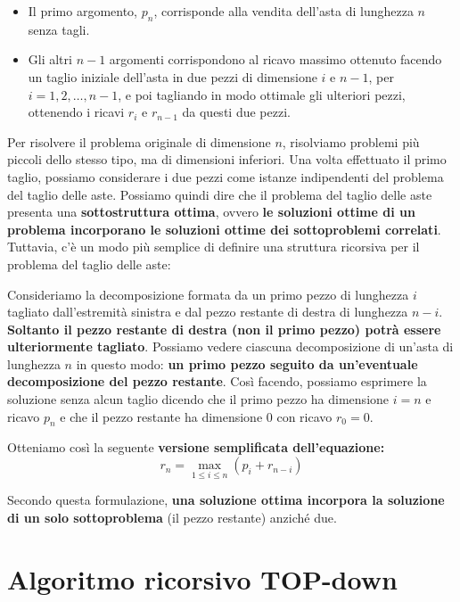 \begin{itemize}
  \item
        Il primo argomento, $p_n$, corrisponde alla vendita dell'asta di
        lunghezza $n$ senza tagli.
  \item
        Gli altri $n-1$ argomenti corrispondono al ricavo massimo ottenuto
        facendo un taglio iniziale dell'asta in due pezzi di dimensione $i$
        e $n-1$, per $i = 1, 2, \ldots, n-1$, e poi tagliando in modo
        ottimale gli ulteriori pezzi, ottenendo i ricavi $r_i$ e $r_{n-1}$
        da questi due pezzi.
\end{itemize}

Per risolvere il problema originale di dimensione $n$,
risolviamo problemi più piccoli dello stesso tipo, ma di dimensioni
inferiori. Una volta effettuato il primo taglio, possiamo considerare i
due pezzi come istanze indipendenti del problema del taglio delle aste.
Possiamo quindi dire che il problema del taglio delle aste presenta una
\textbf{sottostruttura ottima}, ovvero \textbf{le soluzioni ottime di un
  problema incorporano le soluzioni ottime dei sottoproblemi correlati}.\\

Tuttavia, c'è un modo più semplice di definire una struttura ricorsiva
per il problema del taglio delle aste:
\begin{myblockquote}
  Consideriamo la decomposizione formata da un primo pezzo di lunghezza $i$
  tagliato dall'estremità sinistra e dal pezzo restante di destra di lunghezza
  $n-i$. \textbf{Soltanto il pezzo restante di destra (non il primo pezzo) potrà
    essere ulteriormente tagliato}. Possiamo vedere ciascuna decomposizione di
  un'asta di lunghezza $n$ in questo modo: \textbf{un primo pezzo seguito da
    un'eventuale decomposizione del pezzo restante}.  Così facendo, possiamo
  esprimere la soluzione senza alcun taglio dicendo che il primo pezzo ha
  dimensione $i = n$ e ricavo $p_n$ e che il pezzo restante ha dimensione 0 con
  ricavo $r_0 = 0$.
\end{myblockquote}

Otteniamo così la seguente \textbf{versione semplificata
  dell'equazione:}
$$
  r_n = \max_{1 \le i \le n}(p_i + r_{n-i})
$$

Secondo questa formulazione, \textbf{una soluzione ottima incorpora la
  soluzione di un solo sottoproblema} (il pezzo restante) anziché due.

\section{Algoritmo ricorsivo TOP-down}

